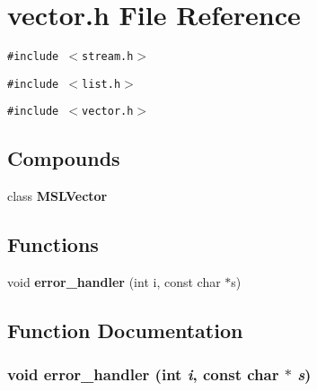 \section{vector.h File Reference}
\label{vector_h}
{\tt \#include $<$stream.h$>$}\par
{\tt \#include $<$list.h$>$}\par
{\tt \#include $<$vector.h$>$}\par
\subsection*{Compounds}
\begin{CompactItemize}
\item 
class {\bf MSLVector}
\end{CompactItemize}
\subsection*{Functions}
\begin{CompactItemize}
\item 
void {\bf error\_\-handler} (int i, const char $\ast$s)
\end{CompactItemize}


\subsection{Function Documentation}
\subsubsection{\setlength{\rightskip}{0pt plus 5cm}void error\_\-handler (int {\em i}, const char $\ast$ {\em s})}\label{vector_h_a0}


